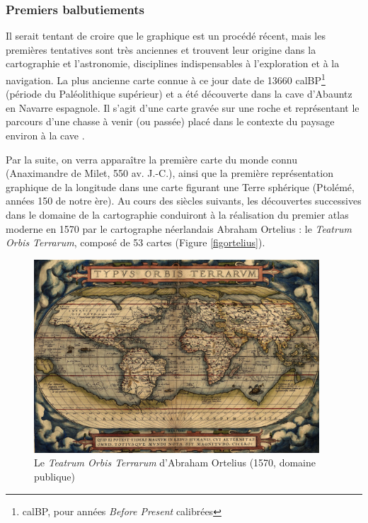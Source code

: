 \documentclass[]{article}
\begin{document}
\hypertarget{premiers-balbutiements}{%
\subsubsection{Premiers balbutiements}\label{premiers-balbutiements}}

Il serait tentant de croire que le graphique est un procédé récent, mais les premières tentatives sont très anciennes et trouvent leur origine dans la cartographie et l'astronomie, disciplines indispensables à l'exploration et à la navigation. La plus ancienne carte connue à ce jour date de 13660 calBP\footnote{calBP, pour années \emph{Before Present} calibrées} (période du Paléolithique supérieur) et a été découverte dans la cave d'Abauntz en Navarre espagnole. Il s'agit d'une carte gravée sur une roche et représentant le parcours d'une chasse à venir (ou passée) placé dans le contexte du paysage environ à la cave \citep{Utrilla2009}.

Par la suite, on verra apparaître la première carte du monde connu (Anaximandre de Milet, 550 av. J.-C.), ainsi que la première représentation graphique de la longitude dans une carte figurant une Terre sphérique (Ptolémé, années 150 de notre ère). Au cours des siècles suivants, les découvertes successives dans le domaine de la cartographie conduiront à la réalisation du premier atlas moderne en 1570 par le cartographe néerlandais Abraham Ortelius : le \emph{Teatrum Orbis Terrarum}, composé de 53 cartes (Figure \ref{figortelius}).

\begin{figure}
\centering
\includegraphics[width=0.95\textwidth,height=\textheight]{img/chap1/ortelius.png}
\caption{Le \emph{Teatrum Orbis Terrarum} d'Abraham Ortelius (1570, domaine publique)}
\end{figure}
\end{document}
